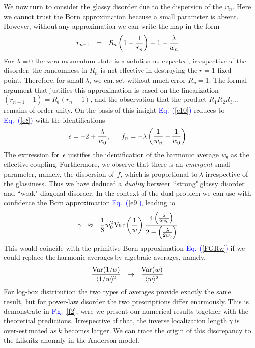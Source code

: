 \documentclass[onecolumn,fleqn,notitlepage,secnumarabic]{revtex4}
\newcommand{\Eq}[1]{\textcolor{blue}{Eq.\!\!~(\ref{#1})}}
\newcommand{\Fig}[1]{\textcolor{blue}{Fig.}\!\!~\ref{#1}}
\newcommand{\be}[1]{\begin{eqnarray}\ifthenelse{#1=-1}{\nonumber}{\ifthenelse{#1=0}{}{\label{e#1}}}}
\newcommand{\ee}{\end{eqnarray}}
\newcommand{\beq}{\be{1}}
\newcommand{\eeq}{\ee}
\begin{document}
%
We now turn to consider the glassy disorder due to the dispersion of the $w_n$. 
Here we cannot trust the Born approximation because a small parameter is absent. 
However, without any approximation we can write the map in the form 
%
\be{10}
r_{n+1} \ \ = \ \ R_n \left( 1 - \frac{1}{r_n}\right) + 1 -\frac{\lambda}{w_n} 
\eeq
%
For $\lambda{=}0$ the zero momentum state is a solution as expected, 
irrespective of the disorder: the randomness in $R_n$ is not effective 
in destroying the ${r=1}$ fixed point. Therefore, for small $\lambda$, 
we can set without much error ${R_n=1}$. The formal argument that justifies 
this approximation is based on the linearization ${(r_{n+1}-1)=R_n(r_n-1)}$, 
and the observation that the product ${R_1R_2R_3...}$ remains of order unity. 
On the basis of this insight \Eq{e10} reduces to \Eq{e8} with the identifications 
%
\beq
\epsilon = -2 + \frac{\lambda}{w_0}, 
\ \ \ \ \ f_n = -\lambda \left(\frac{1}{w_n}-\frac{1}{w_0} \right)
\eeq 
%
The expression for~$\epsilon$ justifies the identification of the harmonic average $w_0$ 
as the effective coupling. Furthermore, we observe that there is an {\em emergent} small parameter, 
namely, the dispersion of~$f$, which is proportional to $\lambda$ irrespective of the glassiness. 
Thus we have deduced a {\em duality} between ``strong" glassy disorder and ``weak" diagonal disorder.
%
In the context of the dual problem we can use with confidence the Born approximation \Eq{e9}, leading to  
%
\be{12}
\gamma \ \ \approx \ \ \frac{1}{8} w_0^2 \, \mbox{Var}\left(\frac{1}{w}\right)  
\, \frac{4\left(\frac{\lambda}{2w_0}\right)}{2-\left(\frac{\lambda}{2w_0}\right)}
\eeq
% 
This would coincide with the primitive Born approximation \Eq{FGRw} 
if we could replace the harmonic averages by algebraic averages, namely,  
%
\beq
\frac{\mbox{Var}(1/w)}{\langle 1/w \rangle^2} 
\ \ \mapsto \ \ 
\frac{\mbox{Var}(w)}{\langle w \rangle^2} 
\eeq 
%
For log-box distribution the two types of averages provide exactly the same result, but for 
power-law disorder the two prescriptions differ enormously. This is demonstrate in \Fig{f2}, 
were we present our numerical results together with the theoretical predictions. 
%
Irrespective of that, the inverse localization length $\gamma$ is over-estimated as $k$ becomes larger. 
We can trace the origin of this discrepancy to the Lifshitz anomaly in the Anderson model.
\end{document}
